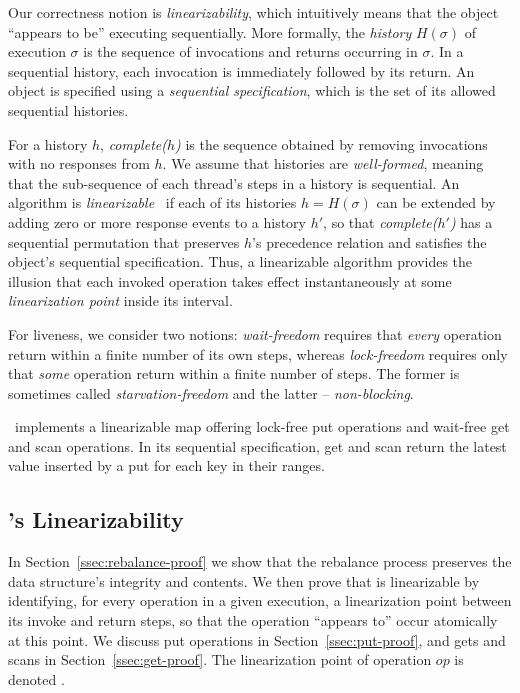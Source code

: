 Our correctness notion is \emph{linearizability}, which intuitively means that the object ``appears to be'' executing sequentially. 
More formally, the \emph{history} $H(\sigma)$ of execution $\sigma$ is the sequence of invocations  and returns occurring in $\sigma$. 
In a sequential history, each invocation is immediately followed by its return. 
An object is specified using a \emph{sequential specification}, which is the set of its allowed sequential histories. 

For a history $h$, \emph{complete($h$)} is the sequence obtained by removing invocations with no responses from $h$.
We assume that histories are \emph{well-formed}, meaning that the sub-sequence of each thread's steps in a history is sequential.
An algorithm is \emph{linearizable}~\cite{HerlihyW1990} if each of its histories $h=H(\sigma)$ can be extended by adding zero or more response events to a history $h'$, 
so that  \emph{complete($h'$)} has a sequential permutation that preserves $h$'s precedence relation and satisfies the object's sequential specification. 
Thus, a linearizable algorithm provides the illusion that each invoked operation takes effect instantaneously at some  \emph{linearization point} inside its interval. 

For liveness, we consider two notions: \emph{wait-freedom} requires that \emph{every} operation return within a finite number of its own steps, whereas \emph{lock-freedom}  
requires only that \emph{some} operation return within a finite number of steps. The former is sometimes called \emph{starvation-freedom} and the latter -- \emph{non-blocking}. 

\kiwi\ implements a linearizable map offering lock-free put operations and wait-free get and scan operations. 
In its sequential specification, get and scan return the latest value inserted by a put for each key in their ranges.





\subsection{\kiwi's Linearizability}
\label{sec:safe}

In Section~\ref{ssec:rebalance-proof} we show that the rebalance process preserves the data structure's integrity and contents. 
We then prove that  {\kiwi} is linearizable by identifying, for every operation in a given execution, a {linearization point} between its invoke and return steps, so that the operation ``appears to'' occur atomically at this point.  We discuss put operations in Section~\ref{ssec:put-proof}, and gets and scans in Section~\ref{ssec:get-proof}. 
The linearization point of operation $op$ is denoted . 




